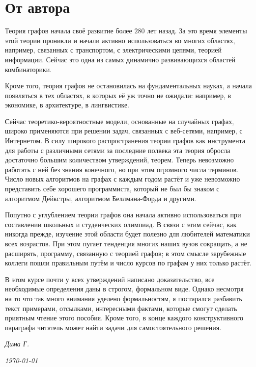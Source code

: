\sloppy
\chapter*{От автора}

	Теория графов начала своё развитие более $280$ лет назад. За это время элементы этой теории проникли и начали активно использоваться во многих областях, например, связанных с транспортом, с электрическими цепями, теорией информации. Сейчас это одна из самых динамично развивающихся областей комбинаторики.
	
	Кроме того, теория графов не остановилась на фундаментальных науках, а начала появляться в тех областях, в которых её уж точно не ожидали: например, в экономике, в архитектуре, в лингвистике.	
	
	Сейчас теоретико-вероятностные модели, основанные на случайных графах, широко применяются при решении задач, связанных с веб-сетями, например, с Интернетом. В силу широкого распространения теории графов как инструмента для работы с различными сетями за последние полвека эта теория обросла достаточно большим количеством утверждений, теорем. Теперь невозможно работать с ней без знания конечного, но при этом огромного числа терминов. Число новых алгоритмов на графах с каждым годом растёт и уже невозможно представить себе хорошего программиста, который не был бы знаком с алгоритмом Дейкстры, алгоритмом Беллмана-Форда и другими.
	
	Попутно с углублением теории графов она начала активно использоваться при составлении школьных и студенческих олимпиад. В связи с этим сейчас, как никогда прежде, изучение этой области будет полезно для любителей математики всех возрастов. При этом пугает тенденция многих наших вузов сокращать, а не расширять, программу, связанную с теорией графов; в этом смысле зарубежные коллеги пошли правильным путём и число курсов по графам у них только растёт.
	
	В этом курсе почти у всех утверждений написано доказательство, все необходимые определения даны в строгом, формальном виде. Однако несмотря на то что так много внимания уделено формальностям, я постарался разбавить текст примерами, отсылками, интересными фактами, которые смогут сделать приятным чтение этого пособия. Кроме того, в конце каждого конструктивного параграфа читатель может найти задачи для самостоятельного решения.


\begin{flushright}
\textit{Дима Г.}

\textit{\today}
\end{flushright}